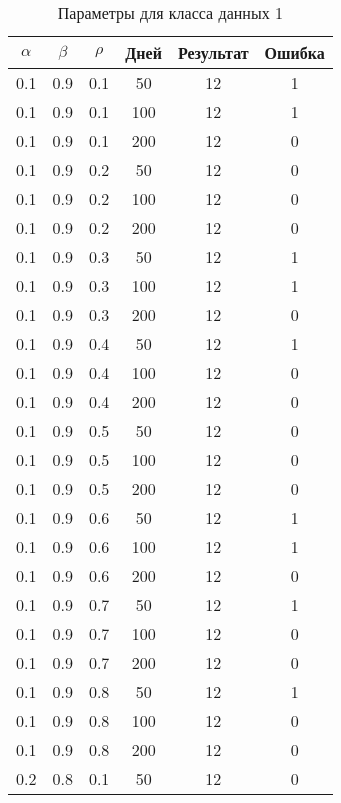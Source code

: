 \begin{center}
\captionsetup{justification=raggedright,singlelinecheck=off}
\begin{longtable}[c]{|c|c|c|c|c|c|}
\caption{Параметры для класса данных 1\label{tbl:table_kd1}}
	\\ \hline
	$\alpha$ & $\beta$ & $\rho$ & Дней & Результат & Ошибка 
	\\ \hline
	0.1 &  0.9 &  0.1 &   50 &    12 &     1 \\
	0.1 &  0.9 &  0.1 &  100 &    12 &     1 \\
	0.1 &  0.9 &  0.1 &  200 &    12 &     0 \\
   \hline
	0.1 &  0.9 &  0.2 &   50 &    12 &     0 \\
	0.1 &  0.9 &  0.2 &  100 &    12 &     0 \\
	0.1 &  0.9 &  0.2 &  200 &    12 &     0 \\
   \hline
	0.1 &  0.9 &  0.3 &   50 &    12 &     1 \\
	0.1 &  0.9 &  0.3 &  100 &    12 &     1 \\
	0.1 &  0.9 &  0.3 &  200 &    12 &     0 \\
   \hline
	0.1 &  0.9 &  0.4 &   50 &    12 &     1 \\
	0.1 &  0.9 &  0.4 &  100 &    12 &     0 \\
	0.1 &  0.9 &  0.4 &  200 &    12 &     0 \\
   \hline
	0.1 &  0.9 &  0.5 &   50 &    12 &     0 \\
	0.1 &  0.9 &  0.5 &  100 &    12 &     0 \\
	0.1 &  0.9 &  0.5 &  200 &    12 &     0 \\
   \hline
	0.1 &  0.9 &  0.6 &   50 &    12 &     1 \\
	0.1 &  0.9 &  0.6 &  100 &    12 &     1 \\
	0.1 &  0.9 &  0.6 &  200 &    12 &     0 \\
   \hline
	0.1 &  0.9 &  0.7 &   50 &    12 &     1 \\
	0.1 &  0.9 &  0.7 &  100 &    12 &     0 \\
	0.1 &  0.9 &  0.7 &  200 &    12 &     0 \\
   \hline
	0.1 &  0.9 &  0.8 &   50 &    12 &     1 \\
	0.1 &  0.9 &  0.8 &  100 &    12 &     0 \\
	0.1 &  0.9 &  0.8 &  200 &    12 &     0 \\
   \hline
	0.2 &  0.8 &  0.1 &   50 &    12 &     0 \\

\end{longtable}
\end{center}
